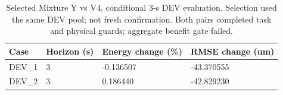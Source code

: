 \begin{table}[t]
\centering\small
\caption{Selected Mixture Y vs V4, conditional 3-s DEV evaluation. Selection used the same DEV pool; not fresh confirmation. Both pairs completed task and physical guards; aggregate benefit gate failed.}
\label{tab:longer}
\begin{tabular}{llll}
\hline
Case & Horizon (s) & Energy change (\%) & RMSE change (um) \\
\hline
DEV\_1 & 3 & -0.136507 & -43.370555 \\
DEV\_2 & 3 & 0.186440 & -42.829230 \\
\hline
\end{tabular}
\end{table}
